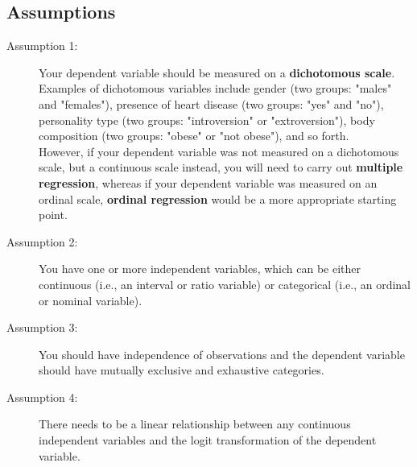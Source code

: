 \documentclass[a4paper,12pt]{article}
\begin{document}
%
%
\newpage
\subsection{Assumptions}

\begin{description}
	\item[Assumption 1:] Your dependent variable should be measured on a \textbf{dichotomous scale}. Examples of dichotomous variables include gender (two groups: "males" and "females"), presence of heart disease (two groups: "yes" and "no"), personality type (two groups: "introversion" or "extroversion"), body composition (two groups: "obese" or "not obese"), and so forth. \\
	\newline
	However, if your dependent variable was not measured on a dichotomous scale, but a continuous scale instead, you will need to carry out \textbf{multiple regression}, whereas if your dependent variable was measured on an ordinal scale, \textbf{ordinal regression} would be a more appropriate starting point.
	
	\item[Assumption 2:] You have one or more independent variables, which can be either continuous (i.e., an interval or ratio variable) or categorical (i.e., an ordinal or nominal variable). 
	
	
	
	\item[Assumption 3:] You should have independence of observations and the dependent variable should have mutually exclusive and exhaustive categories.
	
	\item[Assumption 4:] There needs to be a linear relationship between any continuous independent variables and the logit transformation of the dependent variable. 
\end{description}
\end{document}
